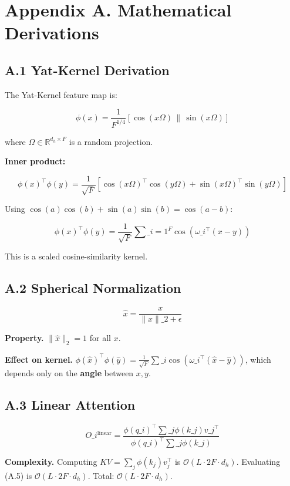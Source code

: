 \section{Appendix A. Mathematical Derivations}

\subsection{A.1 Yat-Kernel Derivation}

The Yat-Kernel feature map is:

\[
\phi(x) = \frac{1}{F^{1/4}} [\cos(x \Omega) \,\|\, \sin(x \Omega)]
\]

where $\Omega \in \mathbb{R}^{d_h \times F}$ is a random projection.

\textbf{Inner product:}

\[
\phi(x)^\top \phi(y) = \frac{1}{\sqrt{F}} [\cos(x\Omega)^\top \cos(y\Omega) 
+ \sin(x\Omega)^\top \sin(y\Omega)]
\]

Using $\cos(a)\cos(b) + \sin(a)\sin(b) = \cos(a - b)$:

\[
\phi(x)^\top \phi(y) = \frac{1}{\sqrt{F}} \sum\_{i=1}^{F} \cos(\omega\_i^\top (x - y))
\]

This is a scaled cosine-similarity kernel.

\subsection{A.2 Spherical Normalization}

\[
\hat{x} = \frac{x}{\|x\|\_2 + \epsilon}
\]

\textbf{Property.} $\|\hat{x}\|_2 = 1$ for all $x$.

\textbf{Effect on kernel.} $\phi(\hat{x})^\top \phi(\hat{y}) = \frac{1}{\sqrt{F}} 
\sum\_i \cos(\omega\_i^\top (\hat{x} - \hat{y}))$, which depends only on the 
\textbf{angle} between $x, y$.

\subsection{A.3 Linear Attention}

\[
O\_i^\text{linear} = \frac{\phi(q\_i)^\top \sum\_j \phi(k\_j) v\_j^\top}{\phi(q\_i)^\top \sum\_j \phi(k\_j)}
\]

\textbf{Complexity.} Computing $KV = \sum_j \phi(k_j) v_j^\top$ is 
$\mathcal{O}(L \cdot 2F \cdot d_h)$. Evaluating (A.5) is $\mathcal{O}(L \cdot 2F \cdot d_h)$. Total: $\mathcal{O}(L \cdot 2F \cdot d_h)$.

